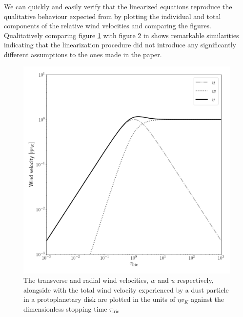 \documentclass[12pt]{article}
\begin{document}
We can quickly and easily verify that the linearized equations reproduce the qualitative behaviour expected from \cite{Weidenschilling77} by plotting the individual and total components of the relative wind velocities and comparing the figures. Qualitatively comparing figure \ref{fig:windvel} with figure 2 in \cite{Weidenschilling77} shows remarkable similarities indicating that the linearization procedure did not introduce any significantly different assumptions to the ones made in the paper.
\begin{figure}[htbp]
    \label{fig:windvel}
    \centering
    \includegraphics[width=0.5\linewidth]{windvel}
    \caption{The transverse and radial wind velocities, $w$ and $u$ respectively, alongside with the total wind velocity experienced by a dust particle in a protoplanetary disk are plotted in the units of $\eta v_K$ against the dimensionless stopping time $\tau_\mathrm{fric}$ }
\end{figure}
\end{document}
